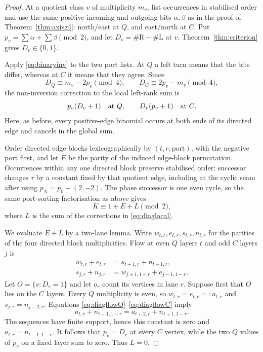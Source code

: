 \documentclass[11pt,letterpaper]{article}
\theoremstyle{plain}
\theoremstyle{definition}
\newcommand{\turnR}{\mathrm{R}}
\newcommand{\turnL}{\mathrm{L}}
\begin{document}
\begin{NoHyper}
\begin{proof}
At a quotient class $v$ of multiplicity $m_v$, list occurrences in stabilised
order and use the same positive incoming and outgoing bits $\alpha,
\beta$ as in the proof of Theorem~\ref{thm:axisg4}: north/east at $Q$, and
east/north at $C$.  Put $p_v=\sum\alpha+\sum\beta\pmod2$, and let
$D_v=\#\turnR-\#\turnL$ at $v$.  Theorem~\ref{thm:criterion} gives
$D_v\in\{0,1\}$.

Apply \eqref{eq:binaryinv} to the two port lists.  At $Q$ a left turn means that
the bits differ, whereas at $C$ it means that they agree.  Since
\[
 D_Q\equiv m_v-2p_v\pmod4,
 \qquad D_C\equiv2p_v-m_v\pmod4,
\]
the non-inversion correction to the local left-rank sum is
\begin{equation}\label{eq:diaglocal}
 p_v(D_v+1)\quad\hbox{at $Q$},
 \qquad D_v(p_v+1)\quad\hbox{at $C$}.
\end{equation}
Here, as before, every positive-edge binomial occurs at both ends of its directed
edge and cancels in the global sum.

Order directed edge blocks lexicographically by $(t,r,\text{port})$, with the
negative port first, and let $E$ be the parity of the induced edge-block
permutation.  Occurrences within any one directed block preserve stabilised order:
successor changes $\tau$ by a constant fixed by that quotient edge, including at
the cyclic seam after using $p_N=p_0+(2,-2)$.  The phase successor is one even
cycle, so the same port-sorting factorisation as above gives
\begin{equation}\label{eq:diagK}
 K\equiv1+E+L\pmod2,
\end{equation}
where $L$ is the sum of the corrections in \eqref{eq:diaglocal}.

We evaluate $E+L$ by a two-lane lemma.  Write $w_{t,r},e_{t,r},s_{t,r},n_{t,r}$
for the parities of the four directed block multiplicities.  Flow at even $Q$
layers $t$ and odd $C$ layers $j$ is
\begin{align}
 w_{t,r}+e_{t,r}&=s_{t+1,r}+n_{t-1,r},\label{eq:diagflowQ}\\
 s_{j,r}+n_{j,r}&=w_{j+1,1-r}+e_{j-1,1-r}.\label{eq:diagflowC}
\end{align}
Let $O=\{v:D_v=1\}$ and let $o_r$ count its vertices in lane $r$.
Suppose first that $O$ lies on the $C$ layers.  Every $Q$ multiplicity is even, so
$w_{t,r}=e_{t,r}=:a_{t,r}$ and $s_{j,r}=n_{j-2,r}$.  Equations
\eqref{eq:diagflowQ}--\eqref{eq:diagflowC} imply
\[
 a_{t,r}+n_{t-1,1-r}=a_{t+2,r}+n_{t+1,1-r}.
\]
The sequences have finite support, hence this constant is zero and
$a_{t,r}=n_{t-1,1-r}$.  It follows that $p_v=D_v$ at every $C$ vertex, while the
two $Q$ values of $p_v$ on a fixed layer sum to zero.  Thus $L=0$.


\end{proof}
\end{NoHyper}
\end{document}
